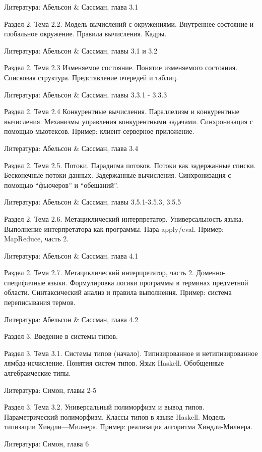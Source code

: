 Литература: Абельсон & Сассман, глава 3.1


Раздел 2. Тема 2.2. Модель вычислений с окружениями.
Внутреннее состояние и глобальное окружение. Правила вычисления. Кадры.

Литература: Абельсон & Сассман, главы 3.1 и 3.2


Раздел 2. Тема 2.3 Изменяемое состояние.
Понятие изменяемого состояния. Списковая структура. Представление очередей
и таблиц.

Литература: Абельсон & Сассман, главы 3.3.1 - 3.3.3


Раздел 2. Тема 2.4 Конкурентные вычисления.
Параллелизм и конкурентные вычисления. Механизмы управления конкурентными
задачами. Синхронизация с помощью мьютексов. Пример: клиент-серверное приложение.

Литература: Абельсон & Сассман, глава 3.4


Раздел 2. Тема 2.5. Потоки.
Парадигма потоков. Потоки как задержанные списки. Бесконечные потоки данных.
Задержанные вычисления. Синхронизация с помощью ``фьючеров'' и ``обещаний''.

Литература: Абельсон & Сассман, главы 3.5.1-3.5.3, 3.5.5


Раздел 2. Тема 2.6. Метациклический интерпретатор.
Универсальность языка. Выполнение интерпретатора как программы. Пара apply/eval.
Пример: MapReduce, часть 2.

Литература: Абельсон & Сассман, глава 4.1


Раздел 2. Тема 2.7. Метациклический интерпретатор, часть 2. Доменно-специфичные языки.
Формулировка логики программы в терминах предметной области. Синтаксический
анализ и правила выполнения. Пример: система переписывания термов.

Литература: Абельсон & Сассман, глава 4.2


Раздел 3. Введение в системы типов.

Раздел 3. Тема 3.1. Системы типов (начало).
Типизированное и нетипизированное лямбда-исчисление. Понятия систем типов. Язык Haskell. 
Обобщенные алгебраические типы.

Литература: Симон, главы 2-5


Раздел 3. Тема 3.2. Универсальный полиморфизм и вывод типов.
Параметрический полиморфизм. Классы типов в языке Haskell. Модель типизации Хиндли—Милнера.
Пример: реализация алгоритма Хиндли-Милнера.

Литература: Симон, глава 6
